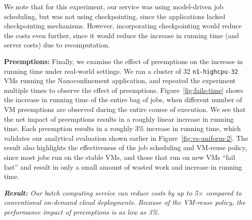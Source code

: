 We note that for this experiment, our  service was using model-driven job scheduling, but was not using checkpointing, since the applications lacked checkpointing mechanisms.
However, incorporating checkpointing would reduce the costs even further, since it would reduce the increase in running time (and server costs) due to recomputation.


\noindent \textbf{Preemptions:} 
Finally, we examine the effect of preemptions on the increase in running time under real-world settings.
We ran a cluster of 32 \texttt{n1-highcpu-32} VMs running the Nanoconfinement application, and repeated the experiment multiple times to observe the effect of preemptions.
Figure~\ref{fig:fails-time} shows the increase in running time of the entire bag of jobs, when different number of VM preemptions are observed during the entire course of execution.
We see that the net impact of preemptions results in a roughly linear increase in running time. 
Each preemption results in a roughly 3\% increase in running time, which validates our analytical evaluation shown earlier in Figure~\ref{fig:vs-uniform-2}.
The result also highlights the effectiveness of the job scheduling and VM-reuse policy, since most jobs run on the stable VMs, and  those that run on new VMs ``fail fast'' and result in only a small amount of wasted work and increase in running time. 





\noindent \emph{\textbf{Result:} Our batch computing service can reduce costs by up to 5$\times$ compared to conventional on-demand cloud deployments. Because of the VM-reuse policy, the performance impact of preemptions is as low as 3\%.}








